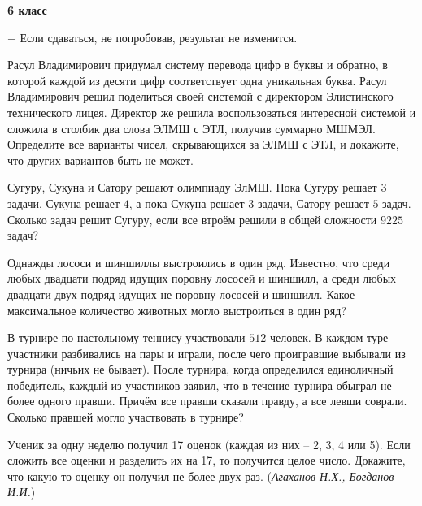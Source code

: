 \hspace{3mm}

\centerline{\bf \huge 6 класс}

\begin{flushright}
        \scriptsize{ $-$ Если сдаваться, не попробовав, результат не изменится.}
\end{flushright}


 Расул Владимирович придумал систему перевода цифр в буквы и обратно, в которой каждой из десяти цифр соответствует одна уникальная буква. Расул Владимирович решил поделиться своей системой с директором Элистинского технического лицея. Директор же решила воспользоваться интересной системой и сложила в столбик два слова ЭЛМШ с ЭТЛ, получив суммарно МШМЭЛ. Определите все варианты чисел, скрывающихся за ЭЛМШ с ЭТЛ, и докажите, что других вариантов быть не может.

Сугуру, Сукуна и Сатору решают олимпиаду ЭлМШ. Пока Сугуру решает $3$ задачи, Сукуна решает $4$, а пока Сукуна решает $3$ задачи, Сатору решает $5$ задач. Сколько задач решит Сугуру, если все втроём решили в общей сложности $9225$ задач?

Однажды лососи и шиншиллы выстроились в один ряд. Известно, что среди любых двадцати подряд идущих поровну лососей и шиншилл, а среди любых двадцати двух подряд идущих не поровну лососей и шиншилл. Какое максимальное количество животных могло выстроиться в один ряд?

В турнире по настольному теннису участвовали $512$ человек. В каждом туре участники разбивались на пары и играли, после чего проигравшие выбывали из турнира (ничьих не бывает). После турнира, когда определился единоличный победитель, каждый из участников заявил, что в течение турнира обыграл не более одного правши. Причём все правши сказали правду, а все левши соврали. Сколько правшей могло участвовать в турнире?

Ученик за одну неделю получил 17 оценок (каждая из них – 2, 3, 4 или 5). Если сложить все оценки и разделить их на 17, то получится целое число. Докажите, что какую-то оценку он получил не более двух раз. (\textit{Агаханов Н.Х., Богданов И.И.})



